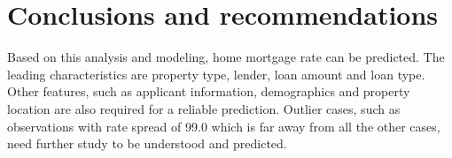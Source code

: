 \documentclass[a4paper,10pt,notitlepage]{article}
\begin{document}
\section{Conclusions and recommendations}

Based on this analysis and modeling, home mortgage rate can be predicted.
The leading characteristics are property type, lender, loan amount and loan type.
Other features, such as applicant information, demographics and property location are also required for a reliable prediction.
Outlier cases, such as observations with rate spread of 99.0 which is far away from all the other cases, 
need further study to be understood and predicted.
\end{document}
